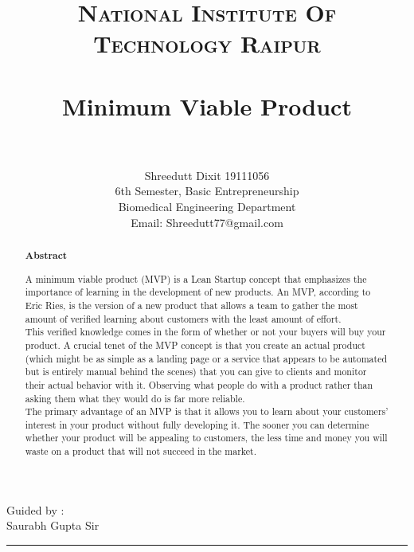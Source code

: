 \documentclass[paper=a4, fontsize=11pt]{scrartcl}
\title{
		\usefont{OT1}{bch}{b}{n}
		\normalfont \normalsize \textsc{National Institute Of Technology Raipur} \\ [25pt]
		\horrule{0.5pt} \\[0.4cm]
		\huge Minimum Viable Product  \\
		\horrule{2pt} \\[0.5cm]
}
\author{
        Shreedutt Dixit 19111056\\6th Semester, 
        Basic Entrepreneurship\\ Biomedical Engineering Department\\	
        Email: Shreedutt77@gmail.com
        \normalsize
}
\date{}
\numberwithin{equation}{section}		%
\numberwithin{figure}{section}			%
\numberwithin{table}{section}				%
\begin{document}
\maketitle
\begin{flushright}
    Guided by :\\
    Saurabh Gupta Sir
\end{flushright}

\noindent\rule{\textwidth}{1pt}
\begin{abstract}

    \begin{center}
        \Large{\textbf{Abstract}}\\
        
    \end{center}

    \Large { A minimum viable product (MVP) is a Lean Startup concept that emphasizes the importance of learning in the development of new products. An MVP, according to Eric Ries, is the version of a new product that allows a team to gather the most amount of verified learning about customers with the least amount of effort.\\
    This verified knowledge comes in the form of whether or not your buyers will buy your product.
    A crucial tenet of the MVP concept is that you create an actual product (which might be as simple as a landing page or a service that appears to be automated but is entirely manual behind the scenes) that you can give to clients and monitor their actual behavior with it. 
    \newpage Observing what people do with a product rather than asking them what they would do is far more reliable.\\
    The primary advantage of an MVP is that it allows you to learn about your customers' interest in your product without fully developing it. The sooner you can determine whether your product will be appealing to customers, the less time and money you will waste on a product that will not succeed in the market. }
\end{abstract}
\end{document}
